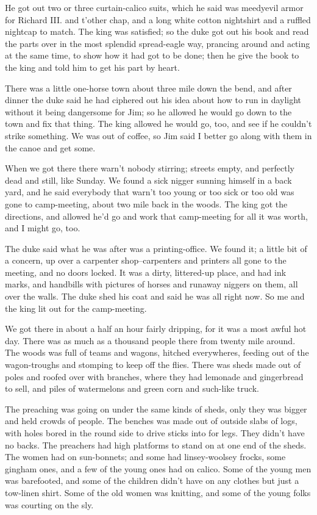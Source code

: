 He got out two or three curtain-calico suits, which he said was meedyevil
armor for Richard III. and t'other chap, and a long white cotton
nightshirt and a ruffled nightcap to match.  The king was satisfied; so
the duke got out his book and read the parts over in the most splendid
spread-eagle way, prancing around and acting at the same time, to show
how it had got to be done; then he give the book to the king and told him
to get his part by heart.

There was a little one-horse town about three mile down the bend, and
after dinner the duke said he had ciphered out his idea about how to run
in daylight without it being dangersome for Jim; so he allowed he would
go down to the town and fix that thing.  The king allowed he would go,
too, and see if he couldn't strike something.  We was out of coffee, so
Jim said I better go along with them in the canoe and get some.

When we got there there warn't nobody stirring; streets empty, and
perfectly dead and still, like Sunday.  We found a sick nigger sunning
himself in a back yard, and he said everybody that warn't too young or
too sick or too old was gone to camp-meeting, about two mile back in the
woods.  The king got the directions, and allowed he'd go and work that
camp-meeting for all it was worth, and I might go, too.

The duke said what he was after was a printing-office.  We found it; a
little bit of a concern, up over a carpenter shop--carpenters and
printers all gone to the meeting, and no doors locked.  It was a dirty,
littered-up place, and had ink marks, and handbills with pictures of
horses and runaway niggers on them, all over the walls.  The duke shed
his coat and said he was all right now.  So me and the king lit out for
the camp-meeting.

We got there in about a half an hour fairly dripping, for it was a most
awful hot day.  There was as much as a thousand people there from twenty
mile around.  The woods was full of teams and wagons, hitched
everywheres, feeding out of the wagon-troughs and stomping to keep off
the flies.  There was sheds made out of poles and roofed over with
branches, where they had lemonade and gingerbread to sell, and piles of
watermelons and green corn and such-like truck.

The preaching was going on under the same kinds of sheds, only they was
bigger and held crowds of people.  The benches was made out of outside
slabs of logs, with holes bored in the round side to drive sticks into
for legs. They didn't have no backs.  The preachers had high platforms to
stand on at one end of the sheds.  The women had on sun-bonnets; and some
had linsey-woolsey frocks, some gingham ones, and a few of the young ones
had on calico.  Some of the young men was barefooted, and some of the
children didn't have on any clothes but just a tow-linen shirt.  Some of
the old women was knitting, and some of the young folks was courting on
the sly.

